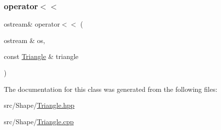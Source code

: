 \subsubsection{\texorpdfstring{operator$<$$<$}{operator<<}}
{\footnotesize\ttfamily ostream\& operator$<$$<$ (\begin{DoxyParamCaption}\item[{ostream \&}]{os,  }\item[{const \hyperlink{class_triangle}{Triangle} \&}]{triangle }\end{DoxyParamCaption})\hspace{0.3cm}{\ttfamily [friend]}}



The documentation for this class was generated from the following files\+:\begin{DoxyCompactItemize}
\item 
src/\+Shape/\hyperlink{_triangle_8hpp}{Triangle.\+hpp}\item 
src/\+Shape/\hyperlink{_triangle_8cpp}{Triangle.\+cpp}\end{DoxyCompactItemize}
